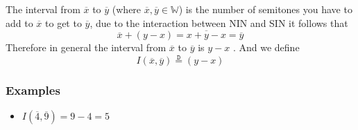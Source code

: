 \documentclass[preview]{standalone}
\begin{document}
\begin{center}
The interval from  $ \overline{x}$ to $ \overline{y }$ (where $ \overline{x}, \overline{y} \in \mathbb{W}$) is the number of semitones you have to add to $ \overline{x}$ to get to $ \overline{y}$, due to the interaction between NIN and SIN it follows that 
  \[
	\overline{x}  +  \left( y  -  x \right) = \overline{x  +  y  -  x} = \overline{y}
  \]
  Therefore in general the interval from $ \overline{x}$  to $ \overline{y}$ is $y  - x$ . And we define 
  \[
	I\left( \overline{x}, \overline{y}\right) \stackrel{\mathtt{D}}{=} (y  -  x) 
  \]
  \subsubsection*{Examples}
  \begin{itemize}
	\item $I\left( \overline{4}, \overline{9}\right) = 9  -  4 = 5$ 
  \end{itemize}
\end{center}
\end{document}
